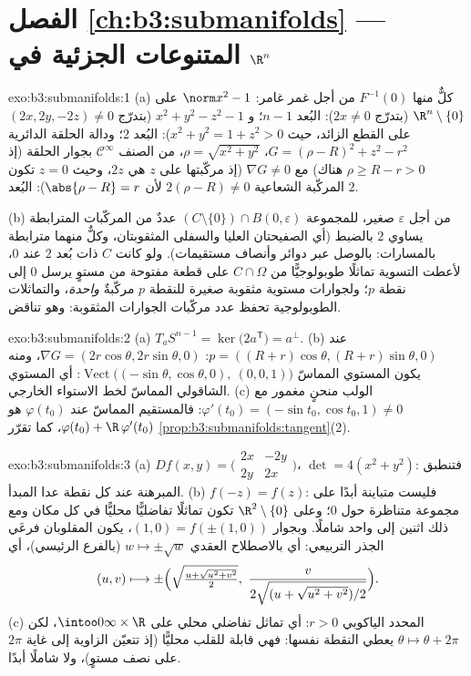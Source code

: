 \section*{الفصل \ref{ch:b3:submanifolds} --- المتنوعات الجزئية في
$\R^n$}

\begin{solution}{exo:b3:submanifolds:1}
(a) كلٌّ منها $F^{-1}(0)$ من أجل غمر غامر: $\norm x^2 - 1$ على
$\R^n\setminus\{0\}$ (بتدرّج $2x \neq 0$): البُعد $n-1$؛ و $x^2 + y^2 - z^2 - 1$ (بتدرّج $(2x, 2y, -2z) \neq 0$
على القطع الزائد، حيث $x^2 + y^2 = 1 + z^2 > 0$): البُعد $2$؛ ودالة الحلقة
الدائرية $G = (\rho - R)^2 + z^2 - r^2$، $\rho =
\sqrt{x^2+y^2}$، من الصنف $\mathcal C^\infty$ بجوار الحلقة (إذ $\rho
\geq R - r > 0$
هناك) مع $\nabla G \neq 0$ (إذ مركّبتها على $z$ هي $2z$، وحيث $z = 0$ تكون
المركّبة الشعاعية $2(\rho - R)\ne0$ لأن $\abs{\rho - R} = r$): البُعد $2$.

(b) من أجل $\varepsilon$ صغير، للمجموعة $(C\setminus\{0\})\cap B(0,\varepsilon)$ عددٌ من المركّبات
المترابطة يساوي $2$ بالضبط (أي الصفيحتان العليا والسفلى
المثقوبتان، وكلٌّ منهما مترابطة بالمسارات: بالوصل عبر دوائر
وأنصاف مستقيمات). ولو كانت $C$  ذات بُعد $2$ عند
$0$، لأعطت التسوية تماثلًا طوبولوجيًّا من $C\cap\Omega$ على قطعة
مفتوحة من مستوٍ يرسل $0$ إلى نقطة $p$؛ ولجوارات مستوية مثقوبة
صغيرة للنقطة $p$ مركّبةٌ \emph{واحدة}، والتماثلات الطوبولوجية
تحفظ عدد مركّبات الجوارات المثقوبة: وهو تناقض.
\end{solution}

\begin{solution}{exo:b3:submanifolds:2}
(a) $T_aS^{n-1} = \ker\bigl(2a^{\mathsf T}\bigr) = a^\perp$.
(b) عند $p = ((R+r)\cos\theta, (R+r)\sin\theta, 0)$: $\nabla G
= (2r\cos\theta, 2r\sin\theta, 0)$، ومنه يكون المستوي المماسّ $\operatorname{Vect}\bigl((-\sin\theta, \cos\theta, 0),\ (0,
0, 1)\bigr)$: أي
المستوي الشاقولي المماسّ لخط الاستواء الخارجي.
(c) الولب منحنٍ مغمور مع $\varphi'(t_0) =
(-\sin t_0, \cos t_0, 1) \neq 0$: فالمستقيم المماسّ عند
$\varphi(t_0)$ هو $\varphi(t_0) + \R\,\varphi'(t_0)$، كما تقرّر \cref{prop:b3:submanifolds:tangent}(2).
\end{solution}

\begin{solution}{exo:b3:submanifolds:3}
(a) $Df(x,y) = \bigl(\begin{smallmatrix}2x & -2y\\ 2y &
2x\end{smallmatrix}\bigr)$، $\det = 4(x^2 + y^2)$: فتنطبق المبرهنة عند كل نقطة عدا المبدأ.
(b) $f(-z) = f(z)$: فليست متباينة أبدًا على مجموعة متناظرة حول
$0$؛ وعلى $\R^2\setminus\{0\}$ تكون تماثلًا تفاضليًّا محليًّا في كل مكان ومع
ذلك اثنين إلى واحد شاملًا. وبجوار $(1, 0) = f(\pm(1,
0))$، يكون المقلوبان فرعَي
الجذر التربيعي: أي بالاصطلاح العقدي $w \mapsto \pm\sqrt w$ (بالفرع الرئيسي)، أي
\[
(u, v) \longmapsto \pm\Bigl(\sqrt{\tfrac{u +
\sqrt{u^2+v^2}}{2}},\ \frac{v}{2\sqrt{(u +
\sqrt{u^2+v^2})/2}}\Bigr).
\]
(c) المحدد الياكوبي $r > 0$: أي تماثل تفاضلي محلي على $\intoo0\infty\times\R$،
لكن $\theta \mapsto \theta + 2\pi$ يعطي النقطة نفسها: فهي قابلة للقلب محليًّا (إذ
تتعيّن الزاوية إلى غاية $2\pi$ على نصف مستوٍ)، ولا شاملًا أبدًا.
\end{solution}

